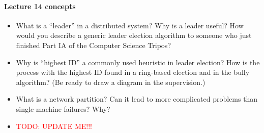 \documentclass[12pt,a4paper,oneside,openright]{report}
\newcommand{\question}[2]{\paragraph{#1} #2}
\newcommand{\todo}[1]{\textcolor{red}{TODO: #1}}
\begin{document}
\question{Lecture 14 concepts}{
  \begin{itemize}
  \item What is a ``leader'' in a distributed system? Why is a leader
    useful? How would you describe a generic leader election algorithm
    to someone who just finished Part IA of the Computer Science
    Tripos?
  \item Why is ``highest ID'' a commonly used heuristic in leader
    election? How is the process with the highest ID found in a
    ring-based election and in the bully algorithm? (Be ready to draw
    a diagram in the supervision.)
  \item What is a network partition? Can it lead to more complicated
    problems than single-machine failures? Why?
  \item \todo{UPDATE ME!!!}
  \end{itemize}
}
\end{document}
